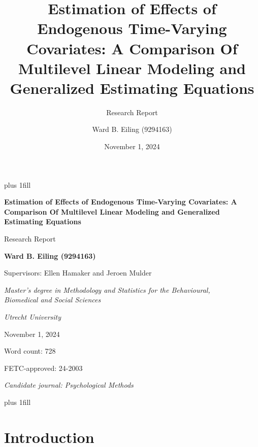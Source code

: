 \documentclass[
  12pt,
  a4paper,
]{article}
\title{Estimation of Effects of Endogenous Time-Varying Covariates: A
Comparison Of Multilevel Linear Modeling and Generalized Estimating
Equations}
\subtitle{Research Report}
\author{Ward B. Eiling (9294163)}
\date{November 1, 2024}
\begin{document}
\cleardoublepage
\thispagestyle{empty}
{\centering
\hbox{}\vskip 0cm plus 1fill
{\Large\bfseries Estimation of Effects of Endogenous Time-Varying
Covariates: A Comparison Of Multilevel Linear Modeling and Generalized
Estimating Equations \par}
\vspace{3ex}
{\large Research Report \par}
\vspace{9ex}
{\large\bfseries Ward B. Eiling (9294163) \par}
\vspace{3ex}
{\large Supervisors: Ellen Hamaker and Jeroen Mulder \par}
\vspace{9ex}
{\normalsize \textit{Master's degree in Methodology and Statistics for the Behavioural, \\ Biomedical and Social Sciences} \par}
\vspace{3ex}
{\normalsize \textit{Utrecht University} \par}
\vspace{9ex}
{\normalsize November 1, 2024 \par}
\vspace{3ex}
{\normalsize Word count: 728 \par}
\vspace{9ex}
{\normalsize FETC-approved: 24-2003 \par}
\vspace{9ex}
{\normalsize \textit{Candidate journal: Psychological Methods} \par}
\hbox{}\vskip 0cm plus 1fill
}


\newpage

\section{Introduction}\label{introduction}
\end{document}
